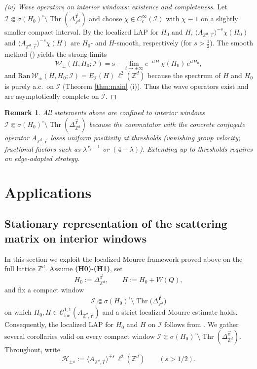 \documentclass[10pt]{amsart} %
\newcommand{\1}{{\mathbb{I}}}
\newcommand{\Thr}{\operatorname{Thr}}
\numberwithin{equation}{section}
\newtheorem{remark}[theorem]{Remark}%
\begin{document}
 \begin{proof}[(iv) Wave operators on interior windows: existence and completeness]
Let $\mathcal{I}\Subset\sigma(H_0)^\circ\setminus\Thr(\Delta_{\mathbb{Z}^d}^{\vec{\mathbf{r}}})$ and choose $\chi\in C_c^\infty(\mathcal{I})$ with $\chi\equiv1$ on a slightly smaller compact interval. By the localized LAP for $H_0$ and $H$, $\langle A_{\mathbb{Z}^d,\vec{\mathrm{r}}}\rangle^{-s}\chi(H_0)$ and $\langle A_{\mathbb{Z}^d,\vec{\mathrm{r}}}\rangle^{-s}\chi(H)$ are $H_0$- and $H$-smooth, respectively (for $s>\tfrac12$). The smooth method (\cite[$\S$7.7]{ABG}) yields the strong limits
\[
\mathcal{W}_\pm(H,H_0;\mathcal{I})=\mathrm{s}\!-\!\lim_{t\to\pm\infty}e^{-\mathrm{i}tH}\,\chi(H_0)\,e^{\mathrm{i}tH_0},
\]
and $\mathrm{Ran}\,\mathcal{W}_\pm(H,H_0;\mathcal{I})=E_\mathcal{I}(H)\,\ell^2(\mathbb{Z}^d)$ because the spectrum of $H$ and $H_0$ is purely a.c.\ on $\mathcal{I}$ (Theorem \ref{thm:main} (i)). Thus the wave operators exist and are asymptotically complete on $\mathcal{I}$.
\end{proof}
\begin{remark}\label{rem:LAP-localized-app}
All statements above are confined to interior windows
$\displaystyle \mathcal{I}\Subset \sigma(H_0)^\circ\setminus\Thr(\Delta_{\mathbb{Z}^d}^{\vec{\mathbf{r}}})$
because the commutator with the concrete conjugate operator $A_{\mathbb{Z}^d,\vec{\mathrm{r}}}$ loses uniform positivity at
thresholds (vanishing group velocity; fractional factors such as $\lambda^{\,r_j-1}$ or $(4-\lambda)$).
Extending up to thresholds requires an edge-adapted strategy.
\end{remark}
\section{Applications}\label{sec:applications}

\subsection{Stationary representation of the scattering matrix on interior windows}
\label{subsec:stationary-S}
In this section we exploit the localized Mourre framework proved above on the full lattice $\mathbb{Z}^d$.
Assume \textbf{(H0)}-\textbf{(H1)}, set
\[
H_0:=\Delta^{\vec{\mathbf{r}}}_{\mathbb{Z}^d},\qquad H:=H_0+W(Q),
\]
and fix a compact window
\[
\mathcal{I}\Subset \sigma(H_0)^\circ\setminus\Thr\!\big(\Delta_{\mathbb{Z}^d}^{\vec{\mathbf{r}}}\big)
\]
on which $H_0,H\in\mathcal{C}^{1,1}_{\mathrm{loc}}(A_{\mathbb{Z}^d,\vec{\mathrm{r}}})$ and a strict localized Mourre estimate holds.
Consequently, the localized LAP for $H_0$ and $H$ on $\mathcal{I}$ follows from \cite{ABG}.
We gather several corollaries valid on every compact window
\(
\mathcal{I}\Subset \sigma(H_0)^\circ\setminus\Thr(\Delta_{\mathbb{Z}^d}^{\vec{\mathbf{r}}}).
\)
Throughout, write
\[
\mathcal{H}_{\pm s}:=\langle A_{\mathbb{Z}^d,\vec{\mathrm{r}}}\rangle^{\mp s}\,\ell^2(\mathbb{Z}^d)\qquad(s>1/2).
\]
\end{document}

